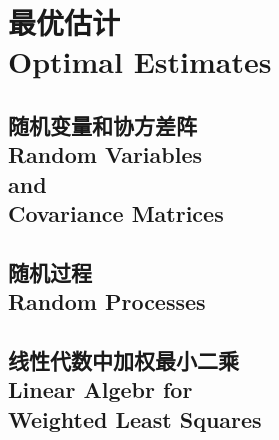 \documentclass[a4paper,12pt]{book}
\begin{document}


\part[最优估计]{最优估计\\Optimal Estimates}
	\chapter[随机变量和协方差阵]{随机变量和协方差阵\\Random Variables \\and\\ Covariance Matrices}
	\minitoc %
	\newpage%
		
		
		
		
		
		
		
		
		
		


	\chapter[随机过程]{随机过程\\Random Processes}
	\minitoc %
	\newpage%
		
		
		
	
		
	\chapter[线性代数中加权最小二乘]{线性代数中加权最小二乘\\Linear Algebr for\\ Weighted Least Squares}
	\minitoc %
	\newpage%
		
		
		
		
		
		
		
		
\end{document}
